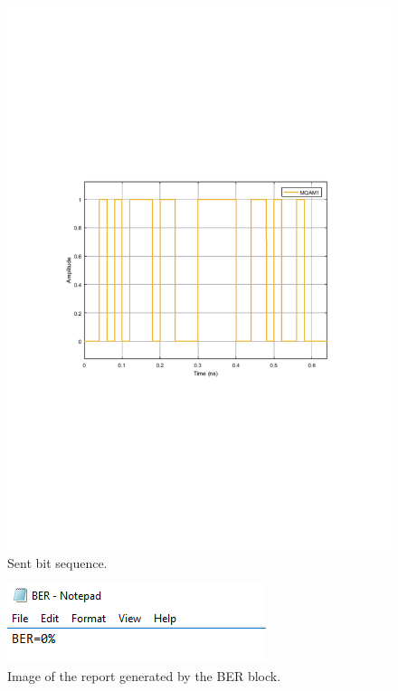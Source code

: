 \documentclass{article}
\begin{document}
\begin{figure}[H]
\centering
\includegraphics[width=\linewidth, trim= 0mm 100mm 0mm 100mm, clip]{sentkey.pdf}
\caption{Sent bit sequence.}
\label{fig:sent}
\end{figure}

\begin{figure}[H]
\centering
\includegraphics{ber.png}
\caption{Image of the report generated by the BER block.}
\label{fig:ber}
\end{figure}



%
%
\end{document}
